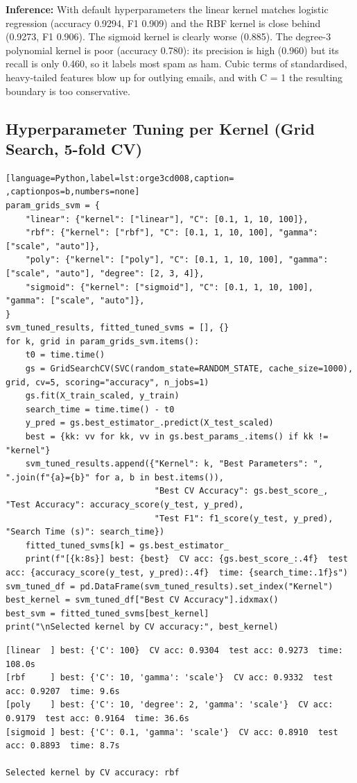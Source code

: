 \documentclass[11pt]{article}
\begin{document}
\textbf{Inference:} With default hyperparameters the linear kernel matches logistic regression (accuracy 0.9294,
F1 0.909) and the RBF kernel is close behind (0.9273, F1 0.906). The sigmoid kernel is
clearly worse (0.885). The degree-3 polynomial kernel is poor (accuracy 0.780): its
precision is high (0.960) but its recall is only 0.460, so it labels most spam as ham. Cubic
terms of standardised, heavy-tailed features blow up for outlying emails, and with C = 1 the
resulting boundary is too conservative.

\subsection*{Hyperparameter Tuning per Kernel (Grid Search, 5-fold CV)}
\label{sec:org3bac789}

\begin{lstlisting}[language=Python,label=lst:orge3cd008,caption= ,captionpos=b,numbers=none]
param_grids_svm = {
    "linear": {"kernel": ["linear"], "C": [0.1, 1, 10, 100]},
    "rbf": {"kernel": ["rbf"], "C": [0.1, 1, 10, 100], "gamma": ["scale", "auto"]},
    "poly": {"kernel": ["poly"], "C": [0.1, 1, 10, 100], "gamma": ["scale", "auto"], "degree": [2, 3, 4]},
    "sigmoid": {"kernel": ["sigmoid"], "C": [0.1, 1, 10, 100], "gamma": ["scale", "auto"]},
}
svm_tuned_results, fitted_tuned_svms = [], {}
for k, grid in param_grids_svm.items():
    t0 = time.time()
    gs = GridSearchCV(SVC(random_state=RANDOM_STATE, cache_size=1000), grid, cv=5, scoring="accuracy", n_jobs=1)
    gs.fit(X_train_scaled, y_train)
    search_time = time.time() - t0
    y_pred = gs.best_estimator_.predict(X_test_scaled)
    best = {kk: vv for kk, vv in gs.best_params_.items() if kk != "kernel"}
    svm_tuned_results.append({"Kernel": k, "Best Parameters": ", ".join(f"{a}={b}" for a, b in best.items()),
                              "Best CV Accuracy": gs.best_score_, "Test Accuracy": accuracy_score(y_test, y_pred),
                              "Test F1": f1_score(y_test, y_pred), "Search Time (s)": search_time})
    fitted_tuned_svms[k] = gs.best_estimator_
    print(f"[{k:8s}] best: {best}  CV acc: {gs.best_score_:.4f}  test acc: {accuracy_score(y_test, y_pred):.4f}  time: {search_time:.1f}s")
svm_tuned_df = pd.DataFrame(svm_tuned_results).set_index("Kernel")
best_kernel = svm_tuned_df["Best CV Accuracy"].idxmax()
best_svm = fitted_tuned_svms[best_kernel]
print("\nSelected kernel by CV accuracy:", best_kernel)
\end{lstlisting}

\begin{verbatim}
[linear  ] best: {'C': 100}  CV acc: 0.9304  test acc: 0.9273  time: 108.0s
[rbf     ] best: {'C': 10, 'gamma': 'scale'}  CV acc: 0.9332  test acc: 0.9207  time: 9.6s
[poly    ] best: {'C': 10, 'degree': 2, 'gamma': 'scale'}  CV acc: 0.9179  test acc: 0.9164  time: 36.6s
[sigmoid ] best: {'C': 0.1, 'gamma': 'scale'}  CV acc: 0.8910  test acc: 0.8893  time: 8.7s

Selected kernel by CV accuracy: rbf
\end{verbatim}
\end{document}
